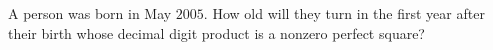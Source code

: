 A person was born in May $2005$. How old will they turn in the first year after their birth whose decimal digit product is a nonzero perfect square?
